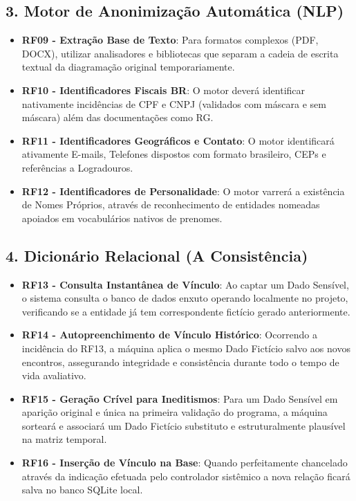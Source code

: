 \documentclass{scrreprt}
\begin{document}
\subsection*{3. Motor de Anonimização Automática (NLP)}
\begin{itemize}
    \item \textbf{RF09 - Extração Base de Texto}: Para formatos complexos (PDF, DOCX), utilizar analisadores e bibliotecas que separam a cadeia de escrita textual da diagramação original temporariamente.
    \item \textbf{RF10 - Identificadores Fiscais BR}: O motor deverá identificar nativamente incidências de CPF e CNPJ (validados com máscara e sem máscara) além das documentações como RG.
    \item \textbf{RF11 - Identificadores Geográficos e Contato}: O motor identificará ativamente E-mails, Telefones dispostos com formato brasileiro, CEPs e referências a Logradouros.
    \item \textbf{RF12 - Identificadores de Personalidade}: O motor varrerá a existência de Nomes Próprios, através de reconhecimento de entidades nomeadas apoiados em vocabulários nativos de prenomes.
\end{itemize}

\subsection*{4. Dicionário Relacional (A Consistência)}
\begin{itemize}
    \item \textbf{RF13 - Consulta Instantânea de Vínculo}: Ao captar um Dado Sensível, o sistema consulta o banco de dados enxuto operando localmente no projeto, verificando se a entidade já tem correspondente fictício gerado anteriormente.
    \item \textbf{RF14 - Autopreenchimento de Vínculo Histórico}: Ocorrendo a incidência do RF13, a máquina aplica o mesmo Dado Fictício salvo aos novos encontros, assegurando integridade e consistência durante todo o tempo de vida avaliativo.
    \item \textbf{RF15 - Geração Crível para Ineditismos}: Para um Dado Sensível em aparição original e única na primeira validação do programa, a máquina sorteará e associará um Dado Fictício substituto e estruturalmente plausível na matriz temporal.
    \item \textbf{RF16 - Inserção de Vínculo na Base}: Quando perfeitamente chancelado através da indicação efetuada pelo controlador sistêmico a nova relação ficará salva no banco SQLite local.
\end{itemize}
\end{document}
